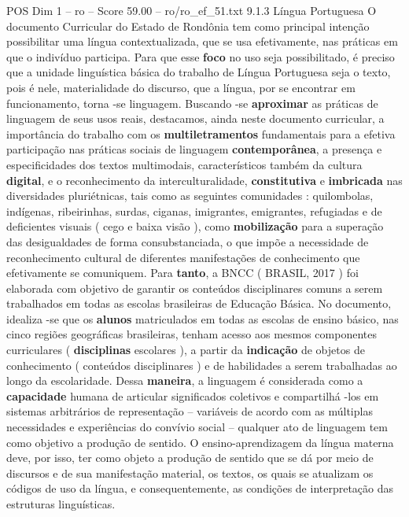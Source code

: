 \begin{textsample}{POS Dim 1 – ro – Score 59.00 – ro/ro\_ef\_51.txt}  \label{ex:f1_pos_136}
9.1.3 Língua Portuguesa O documento Curricular do Estado de Rondônia tem como principal intenção possibilitar uma língua contextualizada, que se usa efetivamente, nas práticas em que o indivíduo participa.
Para que esse \textbf{foco} no uso seja possibilitado, é preciso que a unidade linguística básica do trabalho de Língua Portuguesa seja o texto, pois é nele, materialidade do discurso, que a língua, por se encontrar em funcionamento, torna -se linguagem.
Buscando -se \textbf{aproximar} as práticas de linguagem de seus usos reais, destacamos, ainda neste documento curricular, a importância do trabalho com os \textbf{multiletramentos} fundamentais para a efetiva participação nas práticas sociais de linguagem \textbf{contemporânea}, a presença e especificidades dos textos multimodais, característicos também da cultura \textbf{digital}, e o reconhecimento da interculturalidade, \textbf{constitutiva} e \textbf{imbricada} nas diversidades pluriétnicas, tais como as seguintes comunidades : quilombolas, indígenas, ribeirinhas, surdas, ciganas, imigrantes, emigrantes, refugiadas e de deficientes visuais ( cego e baixa visão ), como \textbf{mobilização} para a superação das desigualdades de forma consubstanciada, o que impõe a necessidade de reconhecimento cultural de diferentes manifestações de conhecimento que efetivamente se comuniquem.
Para \textbf{tanto}, a BNCC ( BRASIL, 2017 ) foi elaborada com objetivo de garantir os conteúdos disciplinares comuns a serem trabalhados em todas as escolas brasileiras de Educação Básica.
No documento, idealiza -se que os \textbf{alunos} matriculados em todas as escolas de ensino básico, nas cinco regiões geográficas brasileiras, tenham acesso aos mesmos componentes curriculares ( \textbf{disciplinas} escolares ), a partir da \textbf{indicação} de objetos de conhecimento ( conteúdos disciplinares ) e de habilidades a serem trabalhadas ao longo da escolaridade.
Dessa \textbf{maneira}, a linguagem é considerada como a \textbf{capacidade} humana de articular significados coletivos e compartilhá -los em sistemas arbitrários de representação – variáveis de acordo com as múltiplas necessidades e experiências do convívio social – qualquer ato de linguagem tem como objetivo a produção de sentido.
O ensino-aprendizagem da língua materna deve, por isso, ter como objeto a produção de sentido que se dá por meio de discursos e de sua manifestação material, os textos, os quais se atualizam os códigos de uso da língua, e consequentemente, as condições de interpretação das estruturas linguísticas.

\end{textsample}
